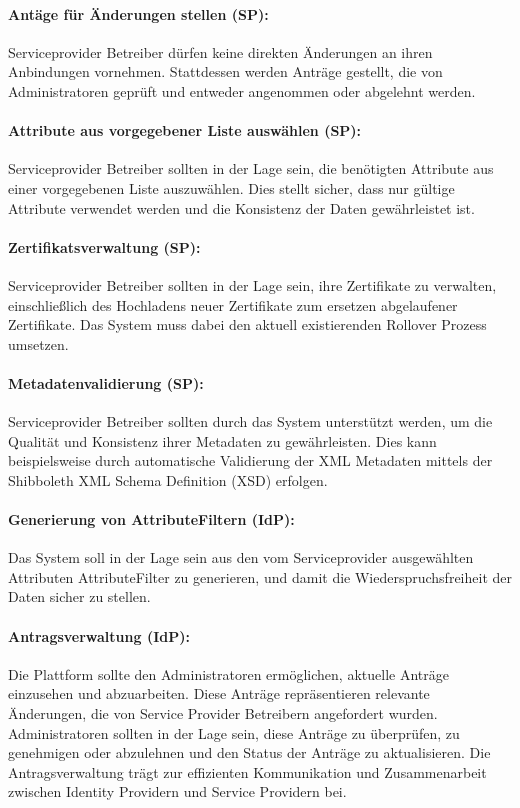 \paragraph{Antäge für Änderungen stellen (SP):}
Serviceprovider Betreiber dürfen keine direkten Änderungen an ihren Anbindungen vornehmen.
Stattdessen werden Anträge gestellt, die von Administratoren geprüft und entweder angenommen oder abgelehnt werden.

\paragraph{Attribute aus vorgegebener Liste auswählen (SP):}
Serviceprovider Betreiber sollten in der Lage sein, die benötigten Attribute aus einer vorgegebenen Liste auszuwählen.
Dies stellt sicher, dass nur gültige Attribute verwendet werden und die Konsistenz der Daten gewährleistet ist.

\paragraph{Zertifikatsverwaltung (SP):}
Serviceprovider Betreiber sollten in der Lage sein, ihre Zertifikate zu verwalten, einschließlich des Hochladens neuer Zertifikate zum ersetzen abgelaufener Zertifikate.
Das System muss dabei den aktuell existierenden Rollover Prozess umsetzen.

\paragraph{Metadatenvalidierung (SP):}
Serviceprovider Betreiber sollten durch das System unterstützt werden, um die Qualität und Konsistenz ihrer Metadaten zu gewährleisten.
Dies kann beispielsweise durch automatische Validierung der XML Metadaten mittels der Shibboleth XML Schema Definition (XSD) erfolgen.

\paragraph{Generierung von AttributeFiltern (IdP):}
Das System soll in der Lage sein aus den vom Serviceprovider ausgewählten Attributen AttributeFilter zu generieren, und damit die Wiederspruchsfreiheit der Daten sicher zu stellen.

\paragraph{Antragsverwaltung (IdP):}
Die Plattform sollte den Administratoren ermöglichen, aktuelle Anträge einzusehen und abzuarbeiten. Diese Anträge repräsentieren relevante Änderungen, die von Service Provider Betreibern angefordert wurden.
Administratoren sollten in der Lage sein, diese Anträge zu überprüfen, zu genehmigen oder abzulehnen und den Status der Anträge zu aktualisieren.
Die Antragsverwaltung trägt zur effizienten Kommunikation und Zusammenarbeit zwischen Identity Providern und Service Providern bei.

